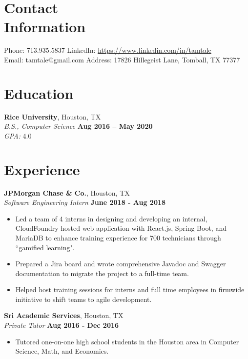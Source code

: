 \documentclass[margin,line]{resume}
\begin{document}
\begin{resume}
    \section{\mysidestyle Contact\\Information}

    Phone: 713.935.5837       \hfill LinkedIn: \url{https://www.linkedin.com/in/tamtale
    } \\
    \noindent Email: tamtale@gmail.com  \hfill
    Address: 17826 Hillegeist Lane, Tomball, TX 77377

    \section{\mysidestyle Education}

    \textbf{Rice University}, Houston, TX \vspace{1mm}\\
    \textsl{B.S., Computer Science} \hfill \textbf{Aug 2016 -- May 2020} \vspace{1mm}\\
    \textsl{GPA: } 4.0 

\section{\mysidestyle Experience}

\textbf{JPMorgan Chase \& Co.}, Houston, TX \vspace{2mm}\\\vspace{1mm}%
\textsl{Software Engineering Intern} \hfill \textbf{June 2018 - Aug 2018}
\begin{itemize}
    \item Led a team of 4 interns in designing and developing an internal, CloudFoundry-hosted web application with React.js, Spring Boot, and MariaDB to enhance training experience for 700 technicians through ``gamified learning".
    \item Prepared a Jira board and wrote comprehensive Javadoc and Swagger documentation to migrate the project to a full-time team.
    \item Helped host training sessions for interns and full time employees in firmwide initiative to shift teams to agile development.
\end{itemize}

\textbf{Sri Academic Services}, Houston, TX \vspace{2mm}\\\vspace{1mm}%
\textsl{Private Tutor} \hfill \textbf{Aug 2016 - Dec 2016}
\begin{itemize}
    \item Tutored one-on-one high school students in the Houston area in Computer Science, Math, and Economics.
\end{itemize}


\end{resume}
\end{document}
